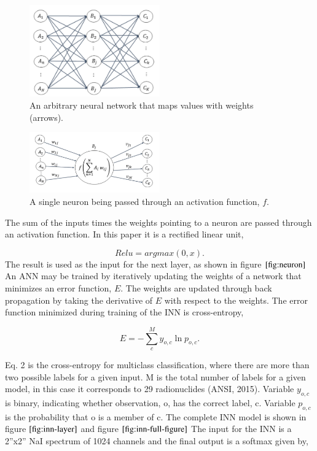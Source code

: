 \documentclass{anstrans}
\begin{document}
\begin{figure}[h]
\centering
\includegraphics[width=0.5\textwidth]{dense-layer-figure.png}
\caption{An arbitrary neural network that maps values with weights (arrows).}
\label{fig:dense-nn}
\end{figure}
\begin{figure}[h]
\centering
\includegraphics[width=0.5\textwidth]{neuron-figure.png}
\caption{A single neuron being passed through an activation function, $\textit{f}$.}
\label{fig:neuron}
\end{figure}

The sum of the inputs times the weights pointing to a neuron are passed through an activation function.
In this paper it is a rectified linear unit,

\begin{equation}
Relu = argmax(0, x).
\end{equation}
The result is used as the input for the next layer, as shown in figure $\ref{fig:neuron}$ 
An ANN may be trained by iteratively updating the weights of a network that minimizes an error function, $E$. 
The weights are updated through back propagation by taking the derivative of $E$ with respect to the weights. 
The error function minimized during training of the INN is cross-entropy,

\begin{equation}
E = -\sum_{c}^{M}y_{o,c}\ln{p_{o,c}}.
\end{equation}


Eq. 2 is the cross-entropy for multiclass classification, where there are more than two possible labels 
for a given input. M is the total number of labels for a given model, in this case it corresponds to 29 
radionuclides (ANSI, 2015). Variable $y_{o,c}$ is binary, indicating whether observation, o, has the correct label, c. 
Variable $p_{o,c}$ is the probability that o is a member of c. The complete INN model is shown in figure $\ref{fig:inn-layer}$ and figure $\ref{fig:inn-full-figure}$ 
The input for the INN is a 2”x2” NaI spectrum of 1024 channels and the final output is a softmax given by,
\end{document}
